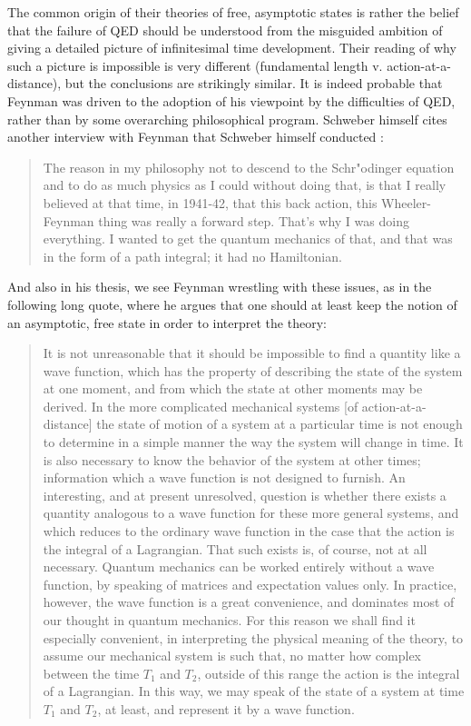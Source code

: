 \documentclass[12pt,a4paper]{article}
\begin{document}
The common origin of their theories of free, asymptotic states is rather the belief that the failure of QED should be understood from the misguided ambition of giving a detailed picture of infinitesimal time development. Their reading of why such a picture is impossible is very different (fundamental length v. action-at-a-distance), but the conclusions are strikingly similar. It is indeed probable that Feynman was driven to the adoption of his viewpoint by the difficulties of QED, rather than by some overarching philosophical program. Schweber himself cites another interview with Feynman that Schweber himself conducted \citep[p. 396]{schweber_1994_qed}:

\begin{quote}
The reason in my philosophy not to descend to the Schr"odinger equation and to do as much physics as I could without doing that, is that I really believed at that time, in 1941-42, that this back action, this Wheeler-Feynman thing was really a forward step. That's why I was doing everything. I wanted to get the quantum mechanics of that, and that was in the form of a path integral; it had no Hamiltonian.
\end{quote}

And also in his thesis, we see Feynman wrestling with these issues, as in the following long quote, where he argues that one should at least keep the notion of an asymptotic, free state in order to interpret the theory:

\begin{quote}
It is not unreasonable that it should be impossible to find a quantity like a wave function, which has the property of describing the state of the system at one moment, and from which the state at other moments may be derived. In the more complicated mechanical systems [of action-at-a-distance] the state of motion of a system at a particular time is not enough to determine in a simple manner the way the system will change in time. It is also necessary to know the behavior of the system at other times; information which a wave function is not designed to furnish. An interesting, and at present unresolved, question is whether there exists a quantity analogous to a wave function for these more general systems, and which reduces to the ordinary wave function in the case that the action is the integral of a Lagrangian. That such exists is, of course, not at all necessary. Quantum mechanics can be worked entirely without a wave function, by speaking of matrices and expectation values only. In practice, however, the wave function is a great convenience, and dominates most of our thought in quantum mechanics. For this reason we shall find it especially convenient, in interpreting the physical meaning of the theory, to assume our mechanical system is such that, no matter how complex between the time $T_1$ and $T_2$, outside of this range the action is the integral of a Lagrangian. In this way, we may speak of the state of a system at time $T_1$ and $T_2$, at least, and represent it by a wave function.
\end{quote}
\end{document}
